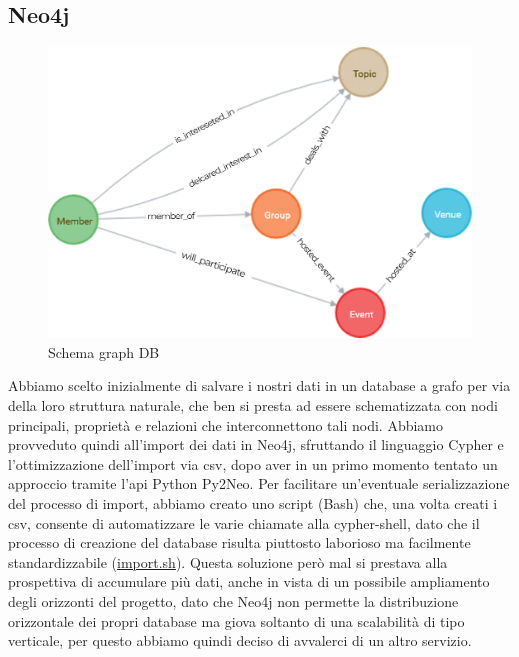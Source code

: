 \documentclass[fleqn,10pt]{SelfArx} %
\begin{document}
{\subsection{Neo4j}%
\begin{figure}
\centering
\includegraphics[scale=0.57]{graph.png}
\caption{\label{graph_neo4j} Schema graph DB}
\end{figure}
Abbiamo scelto inizialmente di salvare i nostri dati in un database a grafo per via della loro struttura naturale, che ben si presta ad essere schematizzata con nodi principali, proprietà e relazioni che interconnettono tali nodi. Abbiamo provveduto quindi all'import dei dati in Neo4j, sfruttando il linguaggio Cypher e l'ottimizzazione dell'import via csv, dopo aver in un primo momento tentato un approccio tramite l'api Python Py2Neo. Per facilitare un'eventuale serializzazione del processo di import, abbiamo creato uno script (Bash) che, una volta creati i csv, consente di automatizzare le varie chiamate alla cypher-shell, dato che il processo di creazione del database risulta piuttosto laborioso ma facilmente standardizzabile (\href{https://github.com/DBertazioli/NeoMeetup/blob/master/Scripts/import_cypher.sh}{import.sh}).
Questa soluzione però mal si prestava alla prospettiva di accumulare più dati, anche in vista di un possibile ampliamento degli orizzonti del progetto, dato che Neo4j non permette la distribuzione orizzontale dei propri database ma giova soltanto di una scalabilità di tipo verticale, per questo abbiamo quindi deciso di avvalerci di un altro servizio.
}
\end{document}
